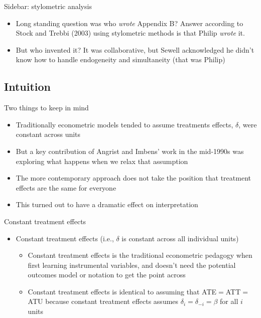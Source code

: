 \documentclass{beamer}
\begin{document}
\begin{frame}{Sidebar: stylometric analysis}

  \begin{itemize}
    \item Long standing question was who \emph{wrote} Appendix B? Answer according to Stock and Trebbi (2003) using stylometric methods is that Philip \emph{wrote} it.
    \item But who invented it?  It was collaborative, but Sewell acknowledged he didn't know how to handle endogeneity and simultaneity (that was Philip)
  \end{itemize}

\end{frame}


\subsection{Intuition}

\begin{frame}{Two things to keep in mind}

  \begin{itemize}
    \item Traditionally econometric models tended to assume treatments effects, $\delta$, were constant across units
    \item But a key contribution of Angrist and Imbens' work in the mid-1990s was exploring what happens when we relax that assumption
    \item The more contemporary approach does not take the position that treatment effects are the same for everyone
    \item This turned out to have a dramatic effect on interpretation
  \end{itemize}

\end{frame}


\begin{frame}{Constant treatment effects}

  \begin{itemize}
    \item Constant treatment effects (i.e., $\delta$ is constant across all individual units)
          \begin{itemize}
            \item Constant treatment effects is the traditional econometric pedagogy when first learning instrumental variables, and doesn't need the potential outcomes model or notation to get the point across
            \item Constant treatment effects is identical to assuming that ATE$=$ATT$=$ATU because constant treatment effects assumes $\delta_i=\delta_{-i}=\beta$ for all $i$ units
          \end{itemize}
  \end{itemize}

\end{frame}
\end{document}
